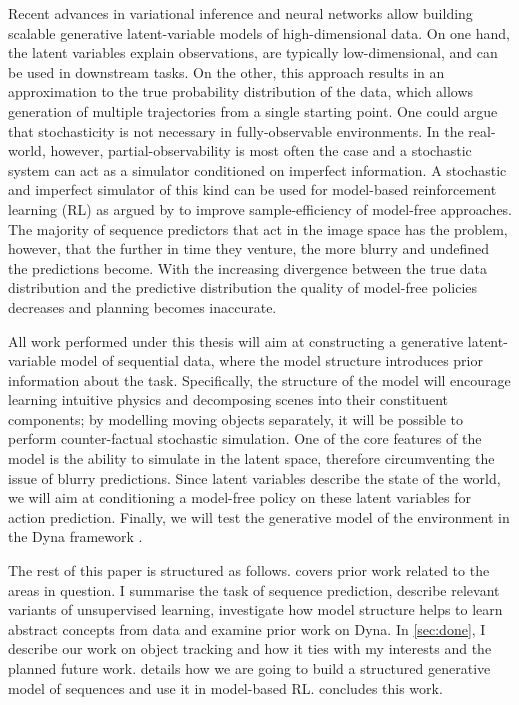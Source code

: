     Recent advances in variational inference and neural networks allow building scalable generative latent-variable models of high-dimensional data.
    On one hand, the latent variables explain observations, are typically low-dimensional, and can be used in downstream tasks.
    On the other, this approach results in an approximation to the true probability distribution of the data, which allows generation of multiple trajectories from a single starting point. 
    One could argue that stochasticity is not necessary in fully-observable environments. In the real-world, however, partial-observability is most often the case and a stochastic system can act as a simulator conditioned on imperfect information. 
%    
    A stochastic and imperfect simulator of this kind can be used for model-based reinforcement learning (RL) as argued by \cite{Sutton1991} to improve sample-efficiency of model-free approaches. 
    The majority of sequence predictors that act in the image space has the problem, however, that the further in time they venture, the more blurry and undefined the predictions become. 
    With the increasing divergence between the true data distribution and the predictive distribution the quality of model-free policies decreases and planning becomes inaccurate.

    All work performed under this thesis will aim at constructing a generative latent-variable model of sequential data, where the model structure introduces prior information about the task. Specifically, the structure of the model will encourage learning intuitive physics and decomposing scenes into their constituent components; by modelling moving objects separately, it will be possible to perform counter-factual stochastic simulation. One of the core features of the model is the ability to simulate in the latent space, therefore circumventing the issue of blurry predictions. Since latent variables describe the state of the world, we will aim at conditioning a model-free policy on these latent variables for action prediction. Finally, we will test the generative model of the environment in the Dyna framework \citep{Sutton1991}.
    
    The rest of this paper is structured as follows.
     covers prior work related to the areas in question.
    I summarise the task of sequence prediction, describe relevant variants of unsupervised learning, investigate how model structure helps to learn abstract concepts from data and examine prior work on Dyna.
    In \cref{sec:done}, I describe our work on object tracking and how it ties with my interests and the planned future work.
     details how we are going to build a structured generative model of sequences and use it in model-based RL.
     concludes this work.